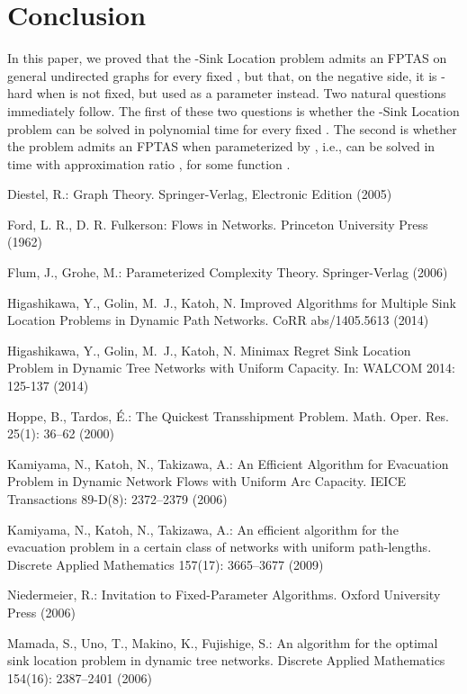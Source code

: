 \documentclass[a4paper,10pt]{llncs}
\begin{document}
\section{Conclusion}

In this paper, we proved that the -{\sc Sink Location} problem admits an FPTAS on general undirected graphs for every fixed , but that, on the negative side, it is -hard when  is not fixed, but used as a parameter instead. Two natural questions immediately follow. The first of these two questions is whether the -{\sc Sink Location} problem can be solved in polynomial time for every fixed . The second is whether the problem admits an FPTAS when parameterized by , i.e., can be solved in time  with approximation ratio , for some function .

\begin{thebibliography}{10}

Diestel, R.:
\newblock Graph Theory.
\newblock Springer-Verlag, Electronic Edition (2005)

Ford, L. R., D. R. Fulkerson:
Flows in Networks.
Princeton University Press (1962)

Flum, J., Grohe, M.:
Parameterized Complexity Theory.
Springer-Verlag (2006)

Higashikawa, Y., Golin, M.~J., Katoh, N.
Improved Algorithms for Multiple Sink Location Problems in Dynamic Path Networks.
CoRR abs/1405.5613 (2014)

Higashikawa, Y., Golin, M.~J., Katoh, N.
Minimax Regret Sink Location Problem in Dynamic Tree Networks with Uniform Capacity.
In: WALCOM 2014: 125-137 (2014)

Hoppe, B., Tardos, \'E.:
The Quickest Transshipment Problem.
Math. Oper. Res. 25(1): 36--62 (2000)

Kamiyama, N., Katoh, N., Takizawa, A.:
An Efficient Algorithm for Evacuation Problem in Dynamic Network Flows with Uniform Arc Capacity.
IEICE Transactions 89-D(8): 2372--2379 (2006)

Kamiyama, N., Katoh, N., Takizawa, A.:
An efficient algorithm for the evacuation problem in a certain class of networks with uniform path-lengths.
Discrete Applied Mathematics 157(17): 3665--3677 (2009)

Niedermeier, R.:
Invitation to Fixed-Parameter Algorithms.
Oxford University Press (2006)

Mamada, S., Uno, T., Makino, K., Fujishige, S.:
An  algorithm for the optimal sink location problem in dynamic tree networks.
Discrete Applied Mathematics 154(16): 2387--2401 (2006)

\end{thebibliography}
\end{document}
